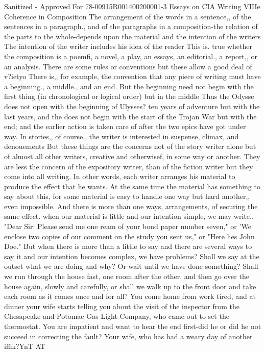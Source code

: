 \documentclass[
    oneside,
    11pt,
    draft
]{memoir}
\begin{document}
Sanitized - Approved For 78-00915R001400200001-3 Essays on CIA Writing VIIIe Coherence in Composition The arrangement of the words in a sentence,, of the sentences in a paragraph., and of the paragraphs in a composition-the relation of the parts to the whole-depends upon the material and the intention of the writers The intention of the writer includes his idea of the reader This is. true whether the composition is a poemfi, a novel, a play, an essays, an editorial., a report,, or an analysis. There are some rules or conventions but these allow a good deal of v?ietyo There is,, for example, the convention that any piece of writing must have a beginning., a middle., and an end. But the beginning need not begin with the first thing (in chronological or logical order) but in the middle Thus the Odysse does not open with the beginning of Ulysses? ten years of adventure but with the last years, and the does not begin with the start of the Trojan War but with the end; and the earlier action is taken care of after the two epics have got under way. In stories,, of course., the writer is interested in suspense, climax, and denouements But these things are the concerns not of the story writer alone but of almost all other writers, creative and otherwisef, in some way or another. They are less the concern of the expository writer, than of the fiction writer but they come into all writing. In other words, each writer arranges his material to produce the effect that he wants. At the same time the material has something to say about this, for some material is easy to handle one way but hard another,, even impossible. And there is more than one ways, arrangements, of securing the same effect. when our material is little and our intention simple, we may write.. "Dear Sir: Please send me one ream of your bond paper number seven," or 'We enclose two copies of our comment on the study you sent us," or "Here lies John Doe." But when there is more than a little to say and there are several ways to say it and our intention becomes complex, we have problems? Shall we say at the outset what we are doing and why? Or wait until we have done something? Shall we run through the house fast, one room after the other, and then go over the house again, slowly and carefully, or shall we walk up to the front door and take each room as it comes once and for all? You come home from work tired, and at dinner your wife starts telling you about the visit of the inspector from the Chesapeake and Potomac Gas Light Company, who came out to set the thermostat. You are impatient and want to hear the end first-did he or did he not succeed in correcting the fault? Your wife, who has had a weary day of another iffik?YnT AT
\end{document}
